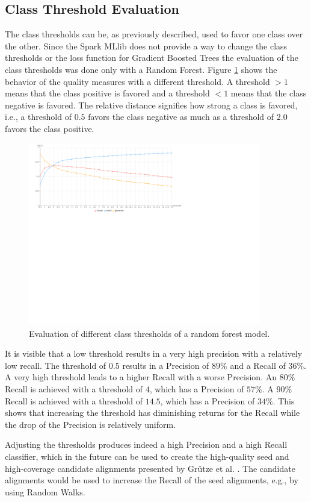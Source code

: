 \subsection{Class Threshold Evaluation}
The class thresholds can be, as previously described, used to favor one class over the other. Since the Spark MLlib does not provide a way to change the class thresholds or the loss function for Gradient Boosted Trees the evaluation of the class thresholds was done only with a Random Forest. Figure \ref{rf_thresh_large} shows the behavior of the quality measures with a different threshold. A threshold $> 1$ means that the class positive is favored and a threshold $< 1$ means that the class negative is favored. The relative distance signifies how strong a class is favored, i.e., a threshold of $0.5$ favors the class negative as much as a threshold of $2.0$ favors the class positive.\par
\begin{figure}[H]
	\centering
	\includegraphics[width=0.9\textwidth]{img/rf_thresh_large}
	\caption{Evaluation of different class thresholds of a random forest model.}
	\label{rf_thresh_large}
\end{figure}
It is visible that a low threshold results in a very high precision with a relatively low recall. The threshold of $0.5$ results in a Precision of $89\%$ and a Recall of $36\%$. A very high threshold leads to a higher Recall with a worse Precision. An $80\%$ Recall is achieved with a threshold of $4$, which has a Precision of $57\%$. A $90\%$ Recall is achieved with a threshold of $14.5$, which has a Precision of $34\%$. This shows that increasing the threshold has diminishing returns for the Recall while the drop of the Precision is relatively uniform.\par
Adjusting the thresholds produces indeed a high Precision and a high Recall classifier, which in the future can be used to create the high-quality seed and high-coverage candidate alignments presented by Grütze et al. \cite{coheel}. The candidate alignments would be used to increase the Recall of the seed alignments, e.g., by using Random Walks.\par

